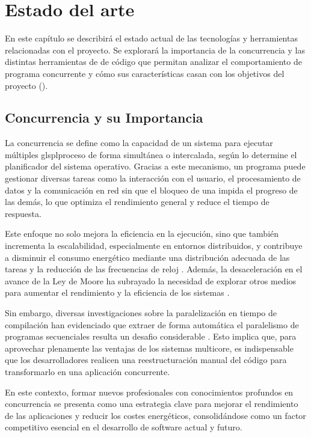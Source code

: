 \chapter{Estado del arte}\label{chap:estado-del-arte}
En este capítulo se describirá el estado actual de las tecnologías y herramientas relacionadas con el proyecto. Se explorará la importancia de la concurrencia y las distintas herramientas de  de código que permitan analizar el comportamiento de \gls{programa concurrente} y cómo sus características casan con los objetivos del proyecto ().

\section{Concurrencia y su Importancia}\label{sec:concurrencia-importancia}

La concurrencia se define como la capacidad de un sistema para ejecutar múltiples glspl{proceso} de forma simultánea o intercalada, según lo determine el \gls{planificador} del sistema operativo. Gracias a este mecanismo, un programa puede gestionar diversas tareas como la interacción con el usuario, el procesamiento de datos y la comunicación en red sin que el bloqueo de una impida el progreso de las demás, lo que optimiza el rendimiento general y reduce el tiempo de respuesta.

Este enfoque no solo mejora la eficiencia en la ejecución, sino que también incrementa la escalabilidad, especialmente en entornos distribuidos, y contribuye a disminuir el consumo energético mediante una distribución adecuada de las tareas y la reducción de las frecuencias de reloj \cite{EnergyEfficiencyParallelAplications}. Además, la desaceleración en el avance de la Ley de Moore \cite{LeyMoore} ha subrayado la necesidad de explorar otros medios para aumentar el rendimiento y la eficiencia de los sistemas \cite{ParallelProgramming}.

Sin embargo, diversas investigaciones sobre la paralelización en \gls{tiempo de compilación} han evidenciado que extraer de forma automática el \gls{paralelismo} de programas secuenciales resulta un desafio considerable \cite{ParallelProgramming}. Esto implica que, para aprovechar plenamente las ventajas de los \gls{sistemas multicore}, es indispensable que los desarrolladores realicen una reestructuración manual del código para transformarlo en una aplicación concurrente.

En este contexto, formar nuevos profesionales con conocimientos profundos en \gls{concurrencia} se presenta como una estrategia clave para mejorar el rendimiento de las aplicaciones y reducir los costes energéticos, consolidándose como un factor competitivo esencial en el desarrollo de \gls{software} actual y futuro.



